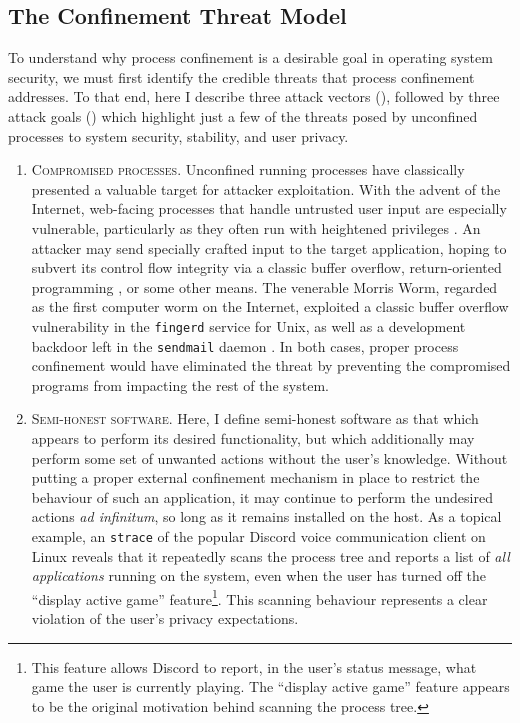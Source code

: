 \documentclass[dvipsnames, 12pt]{article}
\begin{document}
\subsection{The Confinement Threat Model}
\label{subsection:threat_model}

To understand why process confinement is a desirable goal in operating system
security, we must first identify the credible threats that process confinement
addresses. To that end, here I describe three attack vectors
(), followed by three attack goals ()
which highlight just a few of the threats posed by unconfined processes to
system security, stability, and user privacy.

\begin{enumerate}[label=\bfseries A\arabic*., ref=A\arabic*, labelindent=1em]
    \item \label{a:1} \textsc{Compromised processes.} Unconfined running
    processes have classically presented a valuable target for attacker
    exploitation. With the advent of the Internet, web-facing processes that
    handle untrusted user input are especially vulnerable, particularly as they
    often run with heightened privileges \cite{cohen1996_secure}. An attacker
    may send specially crafted input to the target application, hoping to
    subvert its control flow integrity via a classic buffer overflow,
    return-oriented programming \cite{shacham2007_rop}, or some other means. The
    venerable Morris Worm, regarded as the first computer worm on the Internet,
    exploited a classic buffer overflow vulnerability in the \texttt{fingerd}
    service for Unix, as well as a development backdoor left in the
    \texttt{sendmail} daemon \cite{spafford1989_morris}. In both cases, proper
    process confinement would have eliminated the threat by preventing
    the compromised programs from impacting the rest of the system.

    \item \label{a:2} \textsc{Semi-honest software.} Here, I define semi-honest
    software as that which appears to perform its desired functionality, but
    which additionally may perform some set of unwanted actions without the
    user's knowledge. Without putting a proper external confinement mechanism in
    place to restrict the behaviour of such an application, it may continue to
    perform the undesired actions \textit{ad infinitum}, so long as it remains
    installed on the host. As a topical example, an \texttt{strace} of the
    popular Discord \cite{discord} voice communication client on Linux reveals
    that it repeatedly scans the process tree and reports a list of \textit{all
    applications} running on the system, even when the user has turned off the
    \enquote{display active game} feature\footnote{This feature allows Discord
    to report, in the user's status message, what game the user is currently
    playing. The \enquote{display active game} feature appears to be the
    original motivation behind scanning the process tree.}. This scanning
    behaviour represents a clear violation of the user's privacy expectations.


\end{enumerate}
\end{document}
